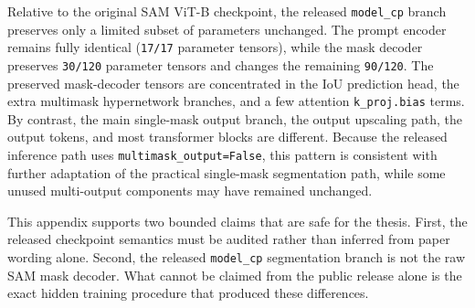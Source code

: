 Relative to the original SAM ViT-B checkpoint, the released \texttt{model\_cp} branch preserves only a limited subset of parameters unchanged. The prompt encoder remains fully identical (\texttt{17/17} parameter tensors), while the mask decoder preserves \texttt{30/120} parameter tensors and changes the remaining \texttt{90/120}. The preserved mask-decoder tensors are concentrated in the IoU prediction head, the extra multimask hypernetwork branches, and a few attention \texttt{k\_proj.bias} terms. By contrast, the main single-mask output branch, the output upscaling path, the output tokens, and most transformer blocks are different. Because the released inference path uses \texttt{multimask\_output=False}, this pattern is consistent with further adaptation of the practical single-mask segmentation path, while some unused multi-output components may have remained unchanged.

This appendix supports two bounded claims that are safe for the thesis. First, the released checkpoint semantics must be audited rather than inferred from paper wording alone. Second, the released \texttt{model\_cp} segmentation branch is not the raw SAM mask decoder. What cannot be claimed from the public release alone is the exact hidden training procedure that produced these differences.
